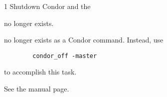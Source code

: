 \begin{ManPage}{\label{man-condor-master-off}}{1}
{Shutdown Condor and the }
\Synopsis {}


\Description 

 no longer exists.

\GenRem
{} no longer exists as a Condor command.
Instead, use
\begin{verbatim}
        condor_off -master
\end{verbatim}
to accomplish this task.

\SeeAlso
See the  manual page.

\end{ManPage}
